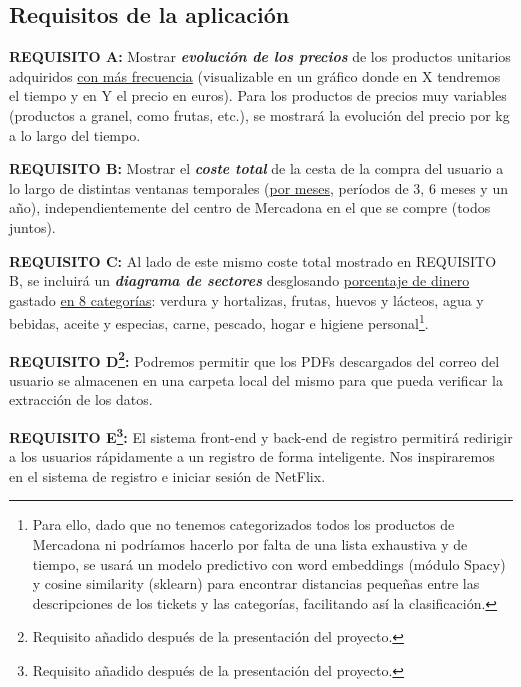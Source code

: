 \documentclass[a4paper,12pt]{report}
\begin{document}
		
			\subsection{Requisitos de la aplicación}
			\label{sec:requisitosAplicacion}
			
		

			

			
		
			
			\textbf{REQUISITO A:} Mostrar\textbf{ \textit{evolución de los precios}} de los productos unitarios adquiridos \underline{con más frecuencia} (visualizable en un gráfico donde en X tendremos el tiempo y en Y el precio en euros). Para los productos de precios muy variables (productos a granel, como frutas, etc.), se mostrará la evolución del precio por kg a lo largo del tiempo.
			
			\textbf{REQUISITO B:} Mostrar el \textbf{\textit{coste total}} de la cesta de la compra del usuario a lo largo de distintas ventanas temporales (\underline{por meses}, períodos de 3, 6 meses y un año), independientemente del centro de Mercadona en el que se compre (todos juntos).
			
			\textbf{REQUISITO C:} Al lado de este mismo coste total mostrado en REQUISITO B, se incluirá un \textbf{\textit{diagrama de sectores}} desglosando \underline{porcentaje de dinero} gastado \underline{en 8 categorías}: verdura y hortalizas, frutas, huevos y lácteos, agua y bebidas, aceite y especias, carne, pescado, hogar e higiene personal\footnote{Para ello, dado que no tenemos categorizados todos los productos de Mercadona ni podríamos hacerlo por falta de una lista exhaustiva y de tiempo, se usará un modelo predictivo con word embeddings (módulo Spacy) y cosine similarity (sklearn) para encontrar distancias pequeñas entre las descripciones de los tickets y las categorías, facilitando así la clasificación.}.
			
			
			\textbf{REQUISITO D\footnote{Requisito añadido después de la presentación del proyecto.}:} Podremos permitir que los PDFs descargados del correo del usuario se almacenen en una carpeta local del mismo para que pueda verificar la extracción de los datos.
			
			\textbf{REQUISITO E\footnote{Requisito añadido después de la presentación del proyecto.}:} El sistema front-end y back-end de registro permitirá redirigir a los usuarios rápidamente a un registro de forma inteligente. Nos inspiraremos en el sistema de  registro e iniciar sesión de NetFlix.
			
\end{document}
